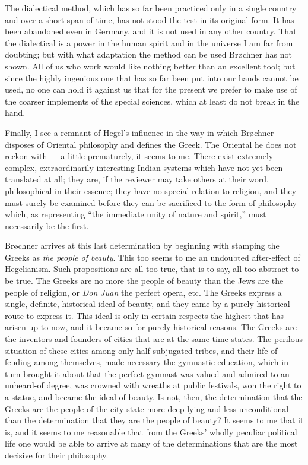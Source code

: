 \documentclass[12pt,a4paper,openany]{book}
\newcommand{\opage}[1]{\marginnote{\footnotesize\textit{[#1]}}}
\begin{document}
The dialectical method, which has so far been practiced only in
a single country and over a short span of time, has not stood the
test in its original form. It has been abandoned even in Germany,
and it is not used in any other country. That the dialectical is
a power in the human spirit and in the universe I am far from
doubting; but with what adaptation the method can be used Brøchner
has not shown. All of us who work would like nothing better than
an excellent tool; but since the highly ingenious one that has so
far been put into our hands cannot be used, no one can hold it
against us that for the present we prefer to make use of the coarser
implements of the special sciences, which at least do not break in
the hand.

Finally, I see a remnant of Hegel's influence in the way in
which Brøchner disposes of Oriental philosophy and defines the
Greek. The Oriental he does not reckon with --- a little
prematurely, it seems to me. There exist extremely complex, %
extraordinarily interesting Indian systems which have not yet been
translated at all; they are, if the reviewer may take others at
their word, philosophical in their essence; they have no special
relation to religion, and they must surely be examined before they
can be sacrificed to the form of philosophy which, as representing
``the immediate unity of nature and spirit,'' must necessarily be
the first.

Brøchner arrives at this last determination by beginning with
stamping the Greeks as \emph{the people of beauty}. This too seems
to me an undoubted after-effect of Hegelianism. Such propositions
are all too true, that is to say, all too abstract to be true. The
Greeks are no more the people of beauty than the Jews are the
people of religion, or \emph{Don Juan} the perfect opera, etc. The
Greeks express a single, definite, historical ideal of beauty, and
they came by a purely historical route to express it. This ideal
is only in certain respects the highest that has arisen up to now,
and it became so for purely historical reasons. The Greeks are the
inventors and founders of cities that are at the same time states.
The perilous situation of these cities among only half-subjugated
tribes, and their life of feuding among themselves, made necessary
the gymnastic education, which in turn brought it about that the
perfect gymnast was valued and admired to an unheard-of degree,
\opage{123}was crowned with wreaths at public festivals, won the right to a
statue, and became the ideal of beauty. Is not, then, the
determination that the Greeks are the people of the city-state
more deep-lying and less unconditional than the determination that
they are the people of beauty? It seems to me that it is, and it
seems to me reasonable that from the Greeks' wholly peculiar
political life one would be able to arrive at many of the
determinations that are the most decisive for their philosophy.
\end{document}
